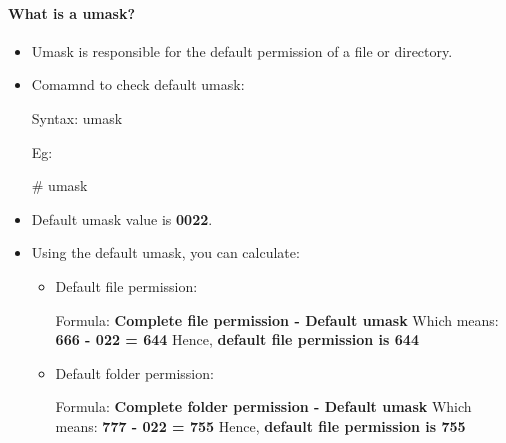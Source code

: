 \setlength{\columnsep}{3pt}
\begin{flushleft}
	\bigskip
	
	\paragraph{What is a umask?}
	\begin{itemize}
		\item Umask is responsible for the default permission of a file or directory.
		\item Comamnd to check default umask:
		\begin{tcolorbox}[breakable,notitle,boxrule=1pt,colback=pink,colframe=pink]
			\color{black}
			\font=9pt
			Syntax:  umask
			\font=4pt
		\end{tcolorbox}
		Eg:
		\begin{tcolorbox}[breakable,notitle,boxrule=1pt,colback=black,colframe=black]
			\color{green}
			\font=9pt
			\# umask
			\color{white}
			\font=4pt
		\end{tcolorbox}
		\item Default umask value is \textbf{0022}.
		\item Using the default umask, you can calculate:
		\begin{itemize}
			\item Default file permission:
				\begin{tcolorbox}[breakable,notitle,boxrule=1pt,colback=pink,colframe=pink]
					\color{black}
					Formula:  \textbf{Complete file permission - Default umask}
					\newline
					Which means: \textbf{666 - 022 = 644}
					\newline
					Hence, \textbf{default file permission is 644}
				\end{tcolorbox}
			\bigskip
			\bigskip
			\item Default folder permission:
					\begin{tcolorbox}[breakable,notitle,boxrule=1pt,colback=pink,colframe=pink]
					\color{black}
					Formula:  \textbf{Complete folder permission - Default umask}
					\newline
					Which means: \textbf{777 - 022 = 755}
					\newline
					Hence, \textbf{default file permission is 755}
				\end{tcolorbox}
		\end{itemize}
	\end{itemize}


\end{flushleft}

